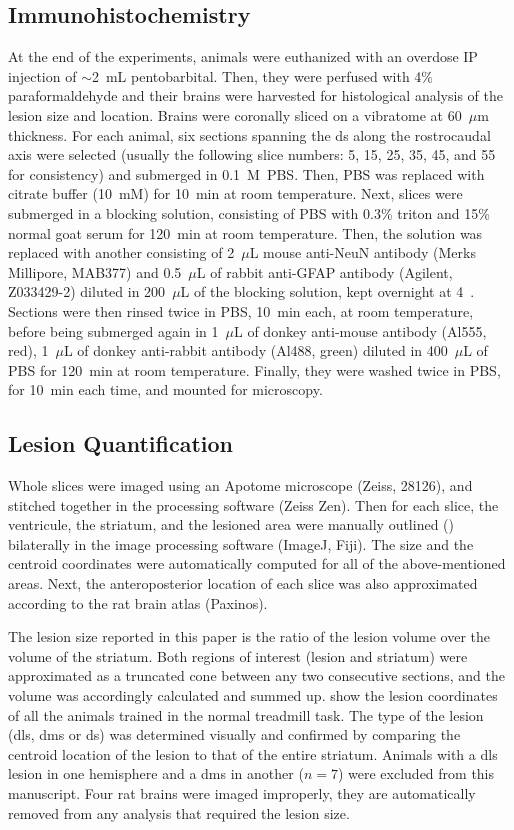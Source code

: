 \subsection{Immunohistochemistry}
At the end of the experiments, animals were euthanized with an overdose IP injection of $\sim$2~mL pentobarbital.
Then, they were perfused with 4\% paraformaldehyde and their brains were harvested for histological analysis of the lesion size and location.
Brains were coronally sliced on a vibratome at 60~$\mu$m thickness.
For each animal, six sections spanning the \gls{ds} along the rostrocaudal axis were selected (usually the following slice numbers: 5, 15, 25, 35, 45, and 55 for consistency) and submerged in 0.1~M~PBS.
Then, PBS was replaced with citrate buffer (10~mM) for 10~min at room temperature.
Next, slices were submerged in a blocking solution, consisting of PBS with 0.3\% triton and 15\% normal goat serum for 120~min at room temperature.
Then, the solution was replaced with another consisting of 2~$\mu$L mouse anti-NeuN antibody (Merks Millipore, MAB377) and 0.5~$\mu$L of rabbit anti-GFAP antibody (Agilent, Z033429-2) diluted in 200~$\mu$L of the blocking solution, kept overnight at 4~\textcelsius.
Sections were then rinsed twice in PBS, 10~min each, at room temperature, before being submerged again in 1~$\mu$L of donkey anti-mouse antibody (Al555, red), 1~$\mu$L of donkey anti-rabbit antibody (Al488, green) diluted in 400~$\mu$L of PBS for 120~min at room temperature.
Finally, they were washed twice in PBS, for 10~min each time, and mounted for microscopy.

\subsection{Lesion Quantification}
Whole slices were imaged using an Apotome microscope (Zeiss, 28126), and stitched together in the processing software (Zeiss Zen).
Then for each slice, the ventricule, the striatum, and the lesioned area were manually outlined () bilaterally in the image processing software (ImageJ, Fiji).
The size and the centroid coordinates were automatically computed for all of the above-mentioned areas.
Next, the anteroposterior location of each slice was also approximated according to the rat brain atlas (Paxinos).
\par
The lesion size reported in this paper is the ratio of the lesion volume over the volume of the striatum.
Both regions of interest (lesion and striatum) were approximated as a truncated cone between any two consecutive sections, and the volume was accordingly calculated and summed up.
 show the lesion coordinates of all the animals trained in the normal treadmill task.
The type of the lesion (\gls{dls}, \gls{dms} or \gls{ds}) was determined visually and confirmed by comparing the centroid location of the lesion to that of the entire striatum.
Animals with a \gls{dls} lesion in one hemisphere and a \gls{dms} in another ($n=7$) were excluded from this manuscript.
Four rat brains were imaged improperly, they are automatically removed from any analysis that required the lesion size.


